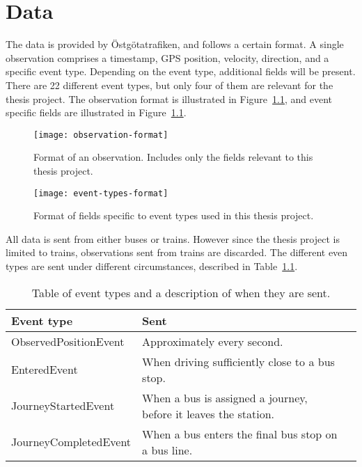 \chapter{Data}\label{ch:data}
The data is provided by Östgötatrafiken, and follows a certain format.
A single observation comprises a timestamp, GPS position, velocity, direction, and a
specific event type. Depending on the event type,
additional fields will be present. There are 22 different event types,
but only four of them are relevant for the thesis project.
The observation format is illustrated in 
Figure~\ref{fig:example-observation}, and event specific fields are
illustrated in Figure~\ref{fig:example-observation}.
\begin{figure}
  \centering
  \texttt{[image: observation-format]}
  \caption{Format of an observation. Includes only the
    fields relevant to this thesis project.}\label{fig:example-observation}
\end{figure}

\begin{figure}
  \centering
  \texttt{[image: event-types-format]}
  \caption{Format of fields specific to event types used in this
    thesis project.}\label{fig:event-types-format}
\end{figure}
All data is sent from either buses or trains. However since the thesis
project is limited to trains, observations sent from trains are
discarded. The different even types are sent under different
circumstances, described in Table~\ref{tbl:event-sent}.

\begin{table}
  \centering
  \caption{Table of event types and a description of when they are sent.}\label{tbl:event-sent}
  \begin{tabular}{ |l|l|l| }
    \hline
    Event type & Sent \\ 
    \hline
    ObservedPositionEvent & Approximately every second. \\
    EnteredEvent & When driving sufficiently close to a bus stop. \\ 
    JourneyStartedEvent & When a bus is assigned a journey, before it
                          leaves the station. \\
    JourneyCompletedEvent & When a bus enters the final bus stop on a
                            bus line. \\ 
    \hline
  \end{tabular}
\end{table}

